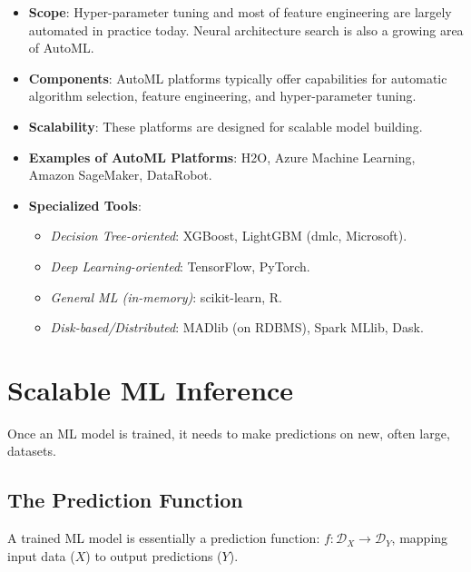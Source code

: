 \documentclass{article}
\begin{document}
\begin{itemize}
    \item \textbf{Scope}: Hyper-parameter tuning and most of feature engineering are largely automated in practice today. Neural architecture search is also a growing area of AutoML.
    \item \textbf{Components}: AutoML platforms typically offer capabilities for automatic algorithm selection, feature engineering, and hyper-parameter tuning.
    \item \textbf{Scalability}: These platforms are designed for scalable model building.
    \item \textbf{Examples of AutoML Platforms}: H2O, Azure Machine Learning, Amazon SageMaker, DataRobot.
    \item \textbf{Specialized Tools}:
    \begin{itemize}
        \item \textit{Decision Tree-oriented}: XGBoost, LightGBM (dmlc, Microsoft).
        \item \textit{Deep Learning-oriented}: TensorFlow, PyTorch.
        \item \textit{General ML (in-memory)}: scikit-learn, R.
        \item \textit{Disk-based/Distributed}: MADlib (on RDBMS), Spark MLlib, Dask.
    \end{itemize}
\end{itemize}

\section*{Scalable ML Inference}
Once an ML model is trained, it needs to make predictions on new, often large, datasets.

\subsection*{The Prediction Function}
A trained ML model is essentially a prediction function: $f: \mathcal{D}_X \rightarrow \mathcal{D}_Y$, mapping input data ($X$) to output predictions ($Y$).
\end{document}
